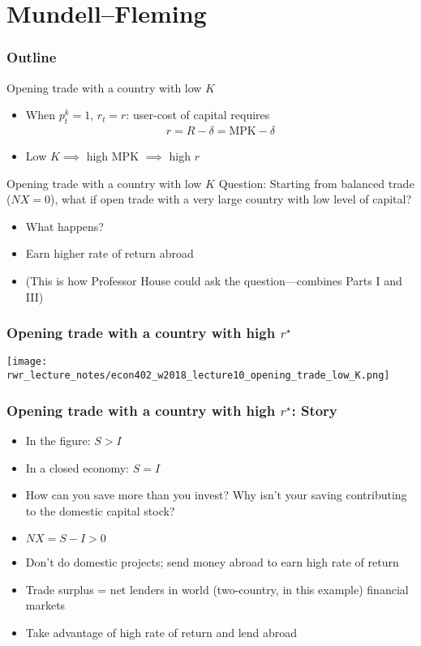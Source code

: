 \documentclass[presentation,dvipsnames]{beamer}
\begin{document}
\section{Mundell--Fleming}
\label{sec-6}

\begin{frame}
\frametitle{Outline}
\tableofcontents[currentsection]
\end{frame}

\begin{frame}[label=sec-6-1]{Opening trade with a country with low $K$}
\begin{itemize}[label={--}]
\item When $p^{k}_{t} = 1$, $r_{t} = r$: user-cost of capital requires
\begin{align*}
r = R - \delta = \text{MPK} - \delta
\end{align*}
\item Low $K \implies$ high $\text{MPK}$ $\implies$ high $r$
\end{itemize}
\end{frame}

\begin{frame}[label=sec-6-1]{Opening trade with a country with low $K$}
Question: \textcolor{RubineRed}{Starting from balanced trade ($NX = 0$),
what if open trade with a very large country with low level of capital?}
\begin{itemize}[label={--}]
\item What happens?
\item Earn higher rate of return abroad
\item (This is how Professor House could ask the question---combines Parts I and III)
\end{itemize}
\end{frame}

\begin{frame}
\frametitle{Opening trade with a country with high $r^{\star}$}
\centerline{\texttt{[image: rwr\_lecture\_notes/econ402\_w2018\_lecture10\_opening\_trade\_low\_K.png]}}
\end{frame}

\begin{frame}
\frametitle{Opening trade with a country with high $r^{\star}$: Story}
\begin{itemize}[label={--}]
\item In the figure: $S > I$
\item In a closed economy: $S = I$
\item How can you save more than you invest? Why isn't your saving contributing to the domestic capital stock?
\item $NX = S - I > 0$
\item Don't do domestic projects; send money abroad to earn high rate of return
\item Trade surplus = net lenders in world (two-country, in this example) financial markets
\item \textcolor{RubineRed}{Take advantage of high rate of return and lend abroad}
\end{itemize}
\end{frame}
\end{document}
